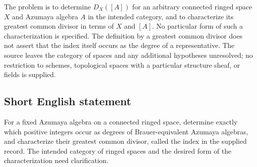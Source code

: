 \documentclass[11pt]{article}
\begin{document}
The problem is to determine \(D_X([A])\) for an arbitrary connected ringed space \(X\) and Azumaya algebra \(A\) in the intended category, and to characterize its greatest common divisor in terms of \(X\) and \([A]\). No particular form of such a characterization is specified. The definition by a greatest common divisor does not assert that the index itself occurs as the degree of a representative. The source leaves the category of spaces and any additional hypotheses unresolved; no restriction to schemes, topological spaces with a particular structure sheaf, or fields is supplied.
\subsection{Short English statement}
For a fixed Azumaya algebra on a connected ringed space, determine exactly which positive integers occur as degrees of Brauer-equivalent Azumaya algebras, and characterize their greatest common divisor, called the index in the supplied record. The intended category of ringed spaces and the desired form of the characterization need clarification.
\end{document}
